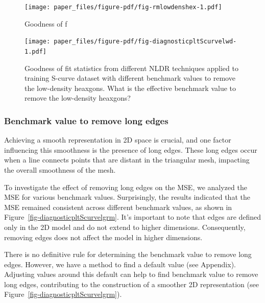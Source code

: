 \documentclass[
  12pt]{article}
\begin{document}
\begin{figure}

{\centering \texttt{[image: paper\_files/figure-pdf/fig-rmlowdenshex-1.pdf]}

}

\caption{\label{fig-rmlowdenshex}Goodness of f}

\end{figure}

\begin{figure}

{\centering \texttt{[image: paper\_files/figure-pdf/fig-diagnosticpltScurvelwd-1.pdf]}

}

\caption{\label{fig-diagnosticpltScurvelwd}Goodness of fit statistics
from different NLDR techniques applied to training S-curve dataset with
different benchmark values to remove the low-density heaxgons. What is
the effective benchmark value to remove the low-density heaxgons?}

\end{figure}

\hypertarget{benchmark-value-to-remove-long-edges}{%
\subsubsection{Benchmark value to remove long
edges}\label{benchmark-value-to-remove-long-edges}}

Achieving a smooth representation in 2D space is crucial, and one factor
influencing this smoothness is the presence of long edges. These long
edges occur when a line connects points that are distant in the
triangular mesh, impacting the overall smoothness of the mesh.

To investigate the effect of removing long edges on the MSE, we analyzed
the MSE for various benchmark values. Surprisingly, the results
indicated that the MSE remained consistent across different benchmark
values, as shown in Figure~\ref{fig-diagnosticpltScurvelgrm}. It's
important to note that edges are defined only in the 2D model and do not
extend to higher dimensions. Consequently, removing edges does not
affect the model in higher dimensions.

There is no definitive rule for determining the benchmark value to
remove long edges. However, we have a method to find a default value
(see Appendix). Adjusting values around this default can help to find
benchmark value to remove long edges, contributing to the construction
of a smoother 2D representation (see
Figure~\ref{fig-diagnosticpltScurvelgrm}).
\end{document}
